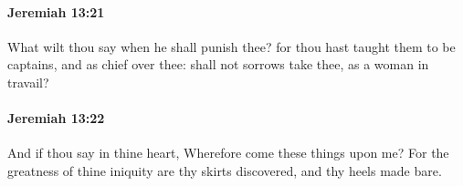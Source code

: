 		\paragraph{Jeremiah 13:21} %
			\label{JEREMIAH-13-21}

			What wilt thou say when he shall punish thee? for thou hast taught them to be captains, and as chief over thee: shall not sorrows take thee, as a woman in travail?


		\paragraph{Jeremiah 13:22} %
			\label{JEREMIAH-13-22}

			And if thou say in thine heart, Wherefore come these things upon me? For the greatness of thine iniquity are thy skirts discovered, and thy heels made bare.



